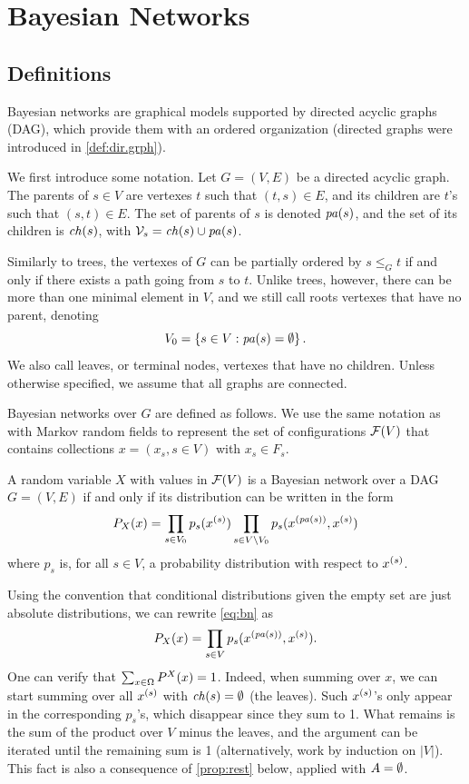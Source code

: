 

\chapter{Bayesian Networks}
\label{chap:bayes.net}
\section{Definitions}

Bayesian networks are graphical models supported
by directed acyclic graphs (DAG), which provide them with an ordered
organization (directed graphs were introduced in  \cref{def:dir.grph}). 

We first introduce some notation. Let $G=(V,E)$ be a directed acyclic graph. The parents of $s\in V$ are
vertexes $t$ such that $(t,s)\in E$, and its children are $t$'s such
that $(s,t)\in E$. The set of parents of $s$ is denoted ${\mathit{pa}(s)}$, and
the set of its children is ${\mathit{ch}(s)}$, with ${\mathcal V}_s = {\mathit{ch}(s)} \cup
{\mathit{pa}(s)}$.

Similarly to trees, the vertexes of $G$ can be
partially ordered by $s\leq_G t$ if and only if
there exists a path going from $s$ to $t$. Unlike trees, however,
there can be more than one minimal element in $V$, and we
still call roots vertexes that have no parent, denoting
$$
V_0 = \left\{ s\in V: {\mathit{pa}(s)} = \emptyset \right\}.
$$
We also call leaves, or terminal nodes, vertexes that have no children. Unless otherwise
specified, we assume that all graphs are connected.

 Bayesian networks over $G$ are defined as follows. We use the same notation as with Markov random fields to represent the set of configurations ${\mathcal F}(V)$ that contains collections $x = (x_s, s\in V)$ with $x_s\in F_s$.
\begin{definition}
\label{def:bn}
A random variable $X$ with values in ${\mathcal F}(V)$ is a Bayesian network over a DAG $G=(V,E)$ if and only
if its distribution can be written in the form
\begin{equation}
\label{eq:bn}
P_X(x) = \prod_{s\in V_0} p_s(x^{(s)}) \prod_{s\in V\setminus V_0} p_s(x^{({\mathit{pa}(s)})}, x^{(s)})
\end{equation}
where $p_s$ is, for all $s\in V$, a probability distribution with
respect to $x^{(s)}$.
\end{definition}
Using the convention that conditional distributions given the empty set
are just absolute distributions, we can rewrite \cref{eq:bn} as
\begin{equation}
\label{eq:bn.2}
P_X(x) = \prod_{s\in V} p_s(x^{({\mathit{pa}(s)})}, x^{(s)}).
\end{equation}
One can verify that $\sum_{x\in \Omega} P^X(x) =1$. Indeed, when summing over $x$, we can
start summing over all $x^{(s)}$ with ${\mathit{ch}(s)}= \emptyset$ (the leaves). Such
$x^{(s)}$'s only appear in the corresponding $p_s$'s, which disappear since they sum
to 1. What remains is the sum of the product over $V$ minus the
leaves, and the argument can be iterated until the remaining sum is 1
(alternatively, work by induction on $|V|$). This fact is also a
consequence of  \cref{prop:rest} below, applied with $A=\emptyset$.



